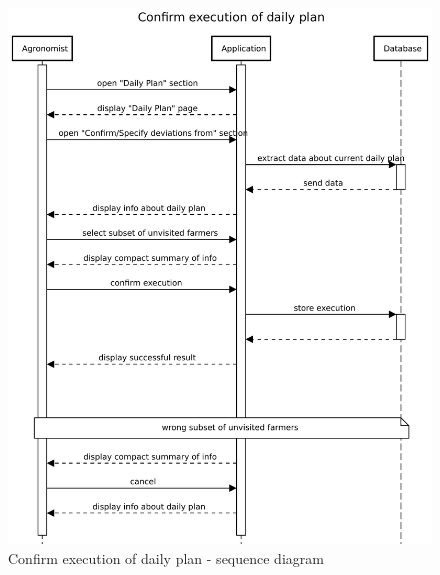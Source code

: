 \begin{figure}[H]
    \centering
    \includegraphics[scale=0.75]{Images/Sequence diagrams/Agronomist - confirm execution of daily plan.pdf}

    \caption{Confirm execution of daily plan - sequence diagram}
    \label{fig:fig:seq_diag_confirm_daily_plan}
\end{figure}